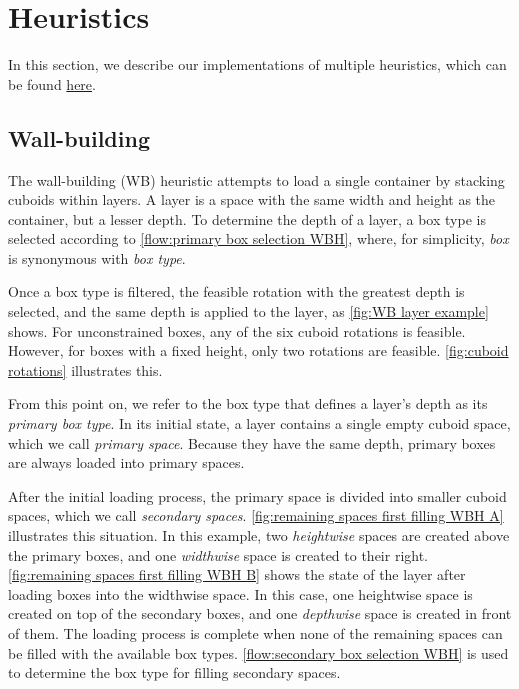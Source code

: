 \section{Heuristics}

In this section, we describe our implementations of multiple heuristics, which can be found \href{https://github.com/phcentenaro7/IC-CLP/tree/main/Code/Authoral/Hummingbird}{here}.

\subsection{Wall-building}
\label{sec:wb implementation}

The wall-building (WB) heuristic attempts to load a single container by stacking cuboids within layers. A layer is a space with the same width and height as the container, but a lesser depth. To determine the depth of a layer, a box type is selected according to \cref{flow:primary box selection WBH}, where, for simplicity, \emph{box} is synonymous with \emph{box type}.



Once a box type is filtered, the feasible rotation with the greatest depth is selected, and the same depth is applied to the layer, as \cref{fig:WB layer example} shows. For unconstrained boxes, any of the six cuboid rotations is feasible. However, for boxes with a fixed height, only two rotations are feasible. \cref{fig:cuboid rotations} illustrates this.



From this point on, we refer to the box type that defines a layer's depth as its \emph{primary box type}. In its initial state, a layer contains a single empty cuboid space, which we call \emph{primary space}. Because they have the same depth, primary boxes are always loaded into primary spaces.



After the initial loading process, the primary space is divided into smaller cuboid spaces, which we call \emph{secondary spaces}. \cref{fig:remaining spaces first filling WBH A} illustrates this situation. In this example, two \emph{heightwise} spaces are created above the primary boxes, and one \emph{widthwise} space is created to their right. \cref{fig:remaining spaces first filling WBH B} shows the state of the layer after loading boxes into the widthwise space. In this case, one heightwise space is created on top of the secondary boxes, and one \emph{depthwise} space is created in front of them. The loading process is complete when none of the remaining spaces can be filled with the available box types. \cref{flow:secondary box selection WBH} is used to determine the box type for filling secondary spaces.

